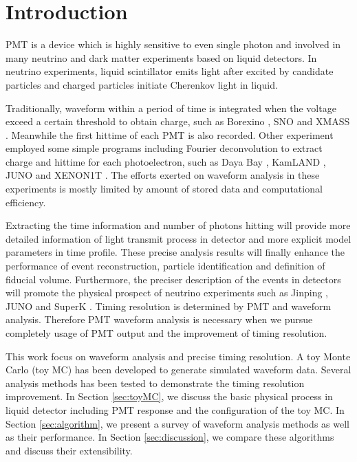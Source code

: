 \section{Introduction} %
\label{sec:introduction}

PMT is a device which is highly sensitive to even single photon and involved in many neutrino and dark matter experiments based on liquid detectors. In neutrino experiments, liquid scintillator emits light after excited by candidate particles and charged particles initiate Cherenkov light in liquid. 

Traditionally, waveform within a period of time is integrated when the voltage exceed a certain threshold to obtain charge, such as Borexino \cite{lagomarsino_gateless_1999}, SNO \cite{dunger_event_2019} and XMASS \cite{abe_xmass_2013}. Meanwhile the first hittime of each PMT is also recorded. Other experiment employed some simple programs including Fourier deconvolution to extract charge and hittime for each photoelectron, such as Daya Bay \cite{huang_flash_2018}, KamLAND \cite{the_kamland_collaboration_production_2010}, JUNO \cite{zhang_comparison_2019} and XENON1T \cite{aprile_xenon1t_2019}. The efforts exerted on waveform analysis in these experiments is mostly limited by amount of stored data and computational efficiency. 

Extracting the time information and number of photons hitting will provide more detailed information of light transmit process in detector and more explicit model parameters in time profile. These precise analysis results will finally enhance the performance of event reconstruction, particle identification and definition of fiducial volume. Furthermore, the preciser description of the events in detectors will promote the physical prospect of neutrino experiments such as Jinping \cite{beacom_physics_2017}, JUNO \cite{an_neutrino_2016} and SuperK \cite{noauthor_super-kamiokande_2003}. Timing resolution is determined by PMT and waveform analysis. Therefore PMT waveform analysis is necessary when we pursue completely usage of PMT output and the improvement of timing resolution. 

This work focus on waveform analysis and precise timing resolution. A toy Monte Carlo (toy MC) has been developed to generate simulated waveform data. Several analysis methods has been tested to demonstrate the timing resolution improvement. In Section \ref{sec:toyMC}, we discuss the basic physical process in liquid detector including PMT response and the configuration of the toy MC. In Section \ref{sec:algorithm}, we present a survey of waveform analysis methods as well as their performance. In Section \ref{sec:discussion}, we compare these algorithms and discuss their extensibility. 

